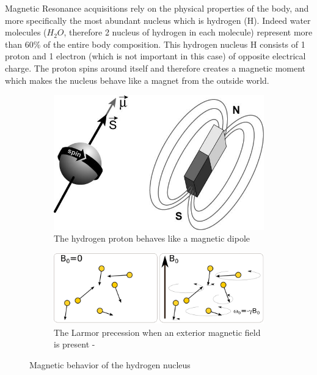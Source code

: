 Magnetic Resonance acquisitions rely on the physical properties of the body, and more specifically the most abundant nucleus which is hydrogen (H). Indeed water molecules ($H_2O$, therefore 2 nucleus of hydrogen in each molecule) represent more than 60\% of the entire body composition. This hydrogen nucleus H consists of 1 proton and 1 electron (which is not important in this case) of opposite electrical charge. The proton spins around itself and therefore creates a magnetic moment which makes the nucleus behave like a magnet from the outside world.
\begin{figure}
    \centering
    \begin{subfigure}[t]{.30\textwidth}
        \includegraphics[width=\textwidth]{figures/hydrogen_magnet}
        \caption{The hydrogen proton behaves like a magnetic dipole}
        \label{fig:hydrogen_magnet}
    \end{subfigure}
    \begin{subfigure}[t]{.68\textwidth}
        \includegraphics[width=\textwidth]{figures/Precession_Larmor_2}
        \caption{The Larmor precession when an exterior magnetic field is present - \cite{hydrogen}}
        \label{fig:larmor_precession}
    \end{subfigure}
    \caption{Magnetic behavior of the hydrogen nucleus}
    \label{fig:hydrogen}
\end{figure}

